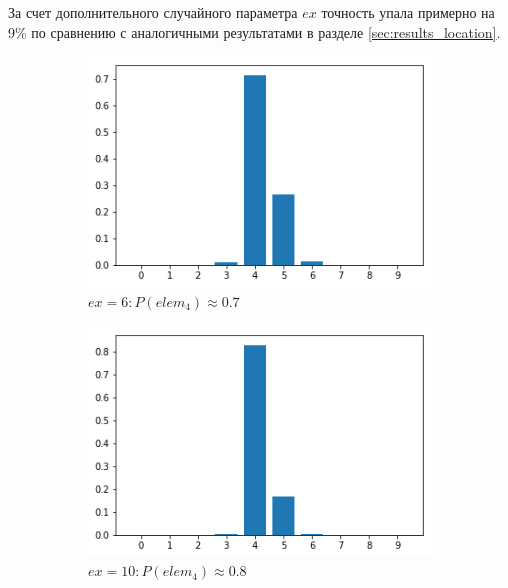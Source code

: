 \documentclass[a4paper,12pt]{article}
\theoremstyle{remark}
\begin{document}
	За счет дополнительного случайного параметра $ex$ точность упала примерно на 9\% по сравнению с аналогичными результатами в разделе \ref{sec:results_location}.
	
	\begin{figure}[h]
		\begin{subfigure}{0.33\textwidth}
			\includegraphics[width=\linewidth]{nn2_damage_90_14_6.png}
			\caption{$ex=6: P(elem_4)\approx0.7$}
		\end{subfigure}
		\begin{subfigure}{0.33\textwidth}
			\includegraphics[width=\linewidth]{nn2_damage_90_14_10.png}
			\caption{$ex=10: P(elem_4)\approx0.8$}
		\end{subfigure}
		\begin{subfigure}{0.33\textwidth}

\end{subfigure}
\end{figure}
\end{document}
